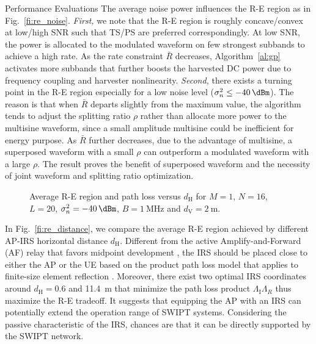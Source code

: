 \documentclass[journal]{IEEEtran}
\begin{document}
\begin{section}{Performance Evaluations}
		The average noise power influences the R-E region as in Fig.~\ref{fi:re_noise}. \emph{First,} we note that the R-E region is roughly concave/convex at low/high SNR such that TS/PS are preferred correspondingly. At low SNR, the power is allocated to the modulated waveform on few strongest subbands to achieve a high rate. As the rate constraint $\bar{R}$ decreases, Algorithm~\ref{al:gp} activates more subbands that further boosts the harvested DC power due to frequency coupling and harvester nonlinearity. \emph{Second,} there exists a turning point in the R-E region especially for a low noise level ($\sigma_n^2 \le \SI{-40}{\dBm}$). The reason is that when $\bar{R}$ departs slightly from the maximum value, the algorithm tends to adjust the splitting ratio $\rho$ rather than allocate more power to the multisine waveform, since a small amplitude multisine could be inefficient for energy purpose. As $\bar{R}$ further decreases, due to the advantage of multisine, a superposed waveform with a small $\rho$ can outperform a modulated waveform with a large $\rho$. The result proves the benefit of superposed waveform and the necessity of joint waveform and splitting ratio optimization.

		\begin{figure}[!t]
			\centering
			\caption{Average R-E region and path loss versus $d_{\mathrm{H}}$ for $M=1$, $N=16$, $L=20$, $\sigma_n^2=\SI{-40}{\dBm}$, $B=\SI{1}{\MHz}$ and $d_{\mathrm{V}}=\SI{2}{\meter}$.}
		\end{figure}

		In Fig.~\ref{fi:re_distance}, we compare the average R-E region achieved by different AP-IRS horizontal distance $d_{\mathrm{H}}$. Different from the active Amplify-and-Forward (AF) relay that favors midpoint development \cite{Li2017}, the IRS should be placed close to either the AP or the UE based on the product path loss model that applies to finite-size element reflection \cite{Ozdogan2020,Tang2021}. Moreover, there exist two optimal IRS coordinates around $d_{\mathrm{H}}=0.6$ and \SI{11.4}{\meter} that minimize the path loss product $\Lambda_{\mathrm{I}}\Lambda_R$ thus maximize the R-E tradeoff. It suggests that equipping the AP with an IRS can potentially extend the operation range of SWIPT systems. Considering the passive characteristic of the IRS, chances are that it can be directly supported by the SWIPT network.


\end{section}
\end{document}
